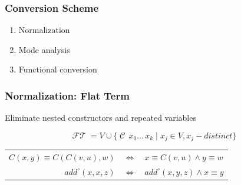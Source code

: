 \documentclass[xcolor=table, aspectratio=169]{beamer}
\DeclareMathOperator{\FlatTerm}{\mathcal{FT}}
\DeclareMathOperator{\Cons}{\mathcal{C}}
\begin{document}
\lstset{basicstyle=\small}

%     
%     

\begin{frame}[fragile]
  \frametitle{Conversion Scheme}
  \begin{center}
    \begin{minipage}{0.4\textwidth}
      \begin{enumerate}
          \item Normalization
          \item Mode analysis
          \item Functional conversion
      \end{enumerate}
    \end{minipage}
  \end{center}
\end{frame}


\begin{frame}[fragile]
  \frametitle{Normalization: Flat Term}
\begin{center}

Eliminate nested constructors and repeated variables

\end{center}

  \[  \FlatTerm = V \cup \{\Cons \, x_0 \ldots \, x_{k} \mid x_{j}\in V, x_j - distinct \} \]

\vfill

\begin{center}
\begin{tabular}{rcl}
 $C\left( x, y \right) \equiv C\left( C\left( v, u \right), w \right)$ & $\iff$ &  $x \equiv C\left(v, u \right) \land y \equiv w$ \\
 $add^{\circ}(x, x, z)$ & $\iff$ & $add^{\circ}\left( x, y, z \right) \land x \equiv y$
\end{tabular}
\end{center}

\end{frame}
\end{document}
